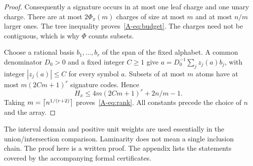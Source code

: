 \begin{proof}
Consequently a signature occurs in at most one leaf charge and one unary charge. There are at most $2\Phi_x(m)$ charges of size at most $m$ and at most $n/m$ larger ones. The tree inequality proves~\eqref{A-eq:budget}. The charges need not be contiguous, which is why $\Phi$ counts subsets.

Choose a rational basis $b_1,\ldots,b_r$ of the span of the fixed alphabet. A common denominator $D_0>0$ and a fixed integer $C\ge1$ give $a=D_0^{-1}\sum_j z_j(a)b_j$, with integer $|z_j(a)|\le C$ for every symbol $a$. Subsets of at most $m$ atoms have at most $m(2Cm+1)^r$ signature codes. Hence
\begin{equation}\label{A-eq:finite-rank}
H_x\le4m(2Cm+1)^r+2n/m-1.
\end{equation}
Taking $m=\left\lceil n^{1/(r+2)}\right\rceil$ proves~\eqref{A-eq:rank}. All constants precede the choice of $n$ and the array.
\end{proof}

The interval domain and positive unit weights are used essentially in the union/intersection comparison. Laminarity does not mean a single inclusion chain. The proof here is a written proof. The appendix lists the statements covered by the accompanying formal certificates.

